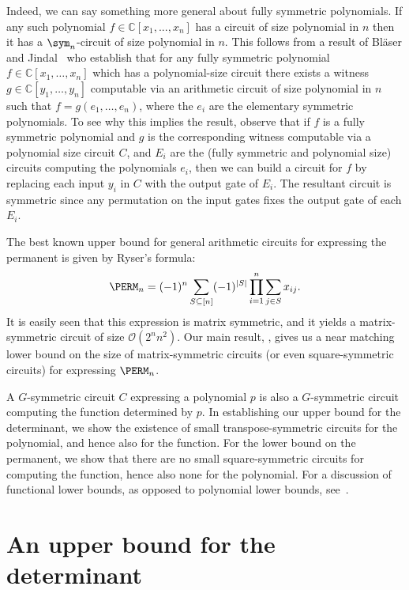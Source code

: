 \documentclass{toc}
\begin{document}
Indeed, we can say something more general about fully symmetric
polynomials.  If any such polynomial $f\in \mathbb{C}[x_1,...,x_n]$ has a circuit of
size polynomial in $n$ then it has a $\sym_n$-circuit of size polynomial in $n$. 
This follows from a result of Bl\"{a}ser and
Jindal~\cite{BlaeserJ19} who establish that for any fully symmetric
polynomial $f \in \mathbb{C}[x_1, \ldots, x_n]$ which has a
polynomial-size circuit there exists a witness
$g\in \mathbb{C}[y_1, \ldots, y_n]$ computable via an arithmetic
circuit of size polynomial in $n$ such that $f = g(e_1, \ldots, e_n)$,
where the %
%
%
$e_i$  %
are the elementary symmetric polynomials.   To see
why this implies the result, observe that if $f$ is a fully symmetric
polynomial and $g$ is the corresponding witness computable via a
polynomial size circuit $C$, and $E_i$ are the (fully symmetric and
polynomial size) circuits computing the polynomials $e_i$, then we can
build a circuit for $f$ by replacing each input $y_i$ in $C$ with the
output gate of $E_i$. The resultant circuit is symmetric since any
permutation on the input gates fixes the output gate of each $E_i$. 
 
The best known upper bound for general arithmetic circuits for expressing the
permanent is given by Ryser's formula:
$$\PERM_n  = (-1)^n \sum_{S \subseteq [n]} (-1)^{|S|} \prod_{i=1}^n
\sum_{j\in S} x_{ij}.$$ It is easily seen that this expression is matrix symmetric, and
it yields a matrix-symmetric circuit of size $\mathcal{O}(2^{n}n^2)$.  Our main result,
, gives us a near matching lower bound on the size of matrix-symmetric circuits (or even square-symmetric circuits) for expressing $\PERM_n$.

A $G$-symmetric circuit $C$ expressing a polynomial $p$ is also a
$G$-symmetric circuit computing the function determined by $p$. In establishing our
upper bound for the determinant, we show the existence of small transpose-symmetric
circuits for the polynomial, and hence also for the function. For the lower
bound on the permanent, we show that there are no small square-symmetric circuits for
computing the function, hence also none for the polynomial. For a discussion of
functional lower bounds, as opposed to polynomial lower bounds,
see~\cite{ForbesKS16}.


%
\section{An upper bound for the determinant}  %
\label{sec:determinant}
\end{document}
